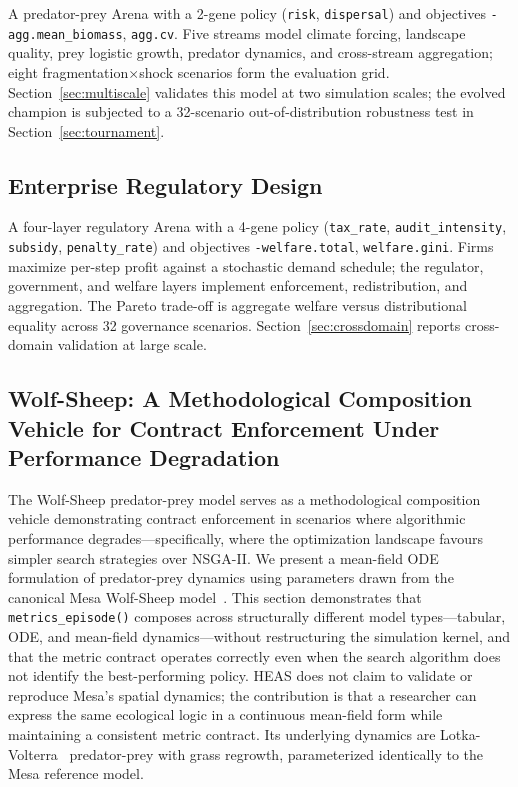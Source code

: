 \documentclass{wscpaperproc}
\begin{document}
A predator-prey Arena with a 2-gene policy (\texttt{risk},
\texttt{dispersal}) and objectives \texttt{-agg.mean\_biomass},
\texttt{agg.cv}. Five streams model climate forcing, landscape quality, prey
logistic growth, predator dynamics, and cross-stream aggregation; eight
fragmentation$\times$shock scenarios form the evaluation grid.
Section~\ref{sec:multiscale} validates this model at two simulation scales; the evolved champion
is subjected to a 32-scenario out-of-distribution robustness test in
Section~\ref{sec:tournament}.

\subsection{Enterprise Regulatory Design}

A four-layer regulatory Arena with a 4-gene policy
(\texttt{tax\_rate}, \texttt{audit\_intensity}, \texttt{subsidy},
\texttt{penalty\_rate}) and objectives \texttt{-welfare.total},
\texttt{welfare.gini}. Firms maximize per-step profit against a stochastic
demand schedule; the regulator, government, and welfare layers implement
enforcement, redistribution, and aggregation. The Pareto trade-off is
aggregate welfare versus distributional equality across 32 governance scenarios.
Section~\ref{sec:crossdomain} reports cross-domain validation at large scale.

\subsection{Wolf-Sheep: A Methodological Composition Vehicle for Contract Enforcement Under Performance Degradation}
\label{sec:wolfsheep}

The Wolf-Sheep predator-prey model serves as a methodological composition vehicle
demonstrating contract enforcement in scenarios where algorithmic performance
degrades---specifically, where the optimization landscape favours simpler search
strategies over NSGA-II.
We present a mean-field ODE formulation of predator-prey dynamics using
parameters drawn from the canonical Mesa Wolf-Sheep model~\cite{wilensky1997wolfsheep,kazil2020mesa}.
This section demonstrates that \texttt{metrics\_episode()} composes across
structurally different model types---tabular, ODE, and mean-field dynamics---without
restructuring the simulation kernel, and that the metric contract operates
correctly even when the search algorithm does not identify the best-performing
policy. HEAS does not claim to validate or reproduce Mesa's spatial dynamics;
the contribution is that a researcher can express the same ecological logic in a
continuous mean-field form while maintaining a consistent metric contract.
Its underlying dynamics are Lotka-Volterra~\cite{lotka1925elements,volterra1926variazioni} predator-prey with grass regrowth,
parameterized identically to the Mesa reference model.
\end{document}
